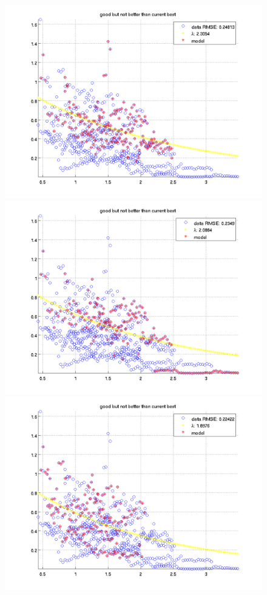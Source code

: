 \documentclass[12pt]{report}
\begin{document}
\begin{figure}[H]
\begin{minipage}[t]{0.5\linewidth}
\end{minipage}
\begin{minipage}[t]{0.5\linewidth}
	\centering
	\includegraphics[scale=\imFeatRan]{images/ransac2}\\
	\includegraphics[scale=\imFeatRan]{images/ransac4}\\
	\includegraphics[scale=\imFeatRan]{images/ransac6}\\

\end{minipage}
\end{figure}
\end{document}
